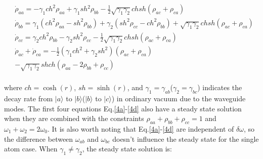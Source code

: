 \documentclass[aps,showpacs,twocolumn,twoside,groupedaddress]{revtex4}
\begin{document}
\begin{widetext}
\begin{subequations}
\begin{align}
&\dot{\rho}_{aa}=-\gamma_{1}ch^{2}\rho_{aa}+\gamma_{1}sh{}^{2}\rho_{bb}-\frac{1}{2}\sqrt{\gamma_{1}\gamma_{2}}chsh(\rho_{ac}+\rho_{ca})\label{4a} \\
&\dot{\rho}_{bb}=\gamma_{1}(ch^{2}\rho_{aa}-sh^{2}\rho_{bb})+\gamma_{2}(sh^{2}\rho_{cc}-ch^{2}\rho_{bb})+\sqrt{\gamma_{1}\gamma_{2}}chsh(\rho_{ac}+\rho_{ca})\label{4b}\\
&\dot{\rho}_{cc}=\gamma_{2}ch^{2}\rho_{bb}-\gamma_{2}sh^{2}\rho_{cc}-\frac{1}{2}\sqrt{\gamma_{1}\gamma_{2}}chsh(\rho_{ac}+\rho_{ca})\label{4c}\\
&\dot{\rho}_{ac}+\dot{\rho}_{ca}=-\frac{1}{2}(\gamma_{1}ch^{2}+\gamma_{2}sh^{2})(\rho_{ac}+\rho_{ca})\nonumber\\
&-\sqrt{\gamma_{1}\gamma_{2}}shch(\rho_{aa}-2\rho_{bb}+\rho_{cc})\label{4d}\\
\end{align}
\end{subequations}
\end{widetext}
where $ch=\cosh(r)$, $sh=\sinh(r)$, and $\gamma_{1}=\gamma_{ab}$($\gamma_{2}=\gamma_{bc}$) indicates the decay rate from $|a\rangle$ to $|b\rangle$($|b\rangle$ to $|c\rangle$) in ordinary vacuum due to the waveguide modes.  The first four equations Eq.\eqref{4a}-\eqref{4d} also have a steady state solution when they are combined with the constraints $\rho_{aa}+\rho_{bb}+\rho_{cc}=1$ and $\omega_1+\omega_2=2\omega_0$. It is also worth noting that Eq.\eqref{4a}-\eqref{4d} are independent of $\delta\omega$, so the difference between $\omega_{ab}$ and $\omega_{bc}$ doesn't influence the steady state for the single atom case. When $\gamma_1\ne\gamma_2$, the steady state solution is:
\end{document}
